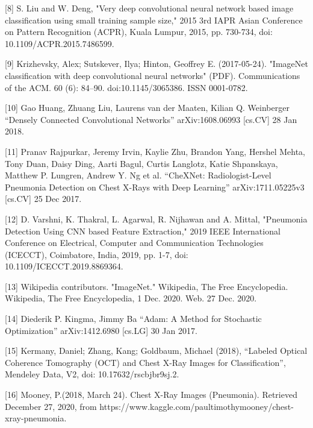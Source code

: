 \documentclass[conference]{IEEEtran}
\begin{document}
[8] S. Liu and W. Deng, "Very deep convolutional neural network based image classification using small training sample size," 2015 3rd IAPR Asian Conference on Pattern Recognition (ACPR), Kuala Lumpur, 2015, pp. 730-734, doi: 10.1109/ACPR.2015.7486599.
\newline

[9] Krizhevsky, Alex; Sutskever, Ilya; Hinton, Geoffrey E. (2017-05-24). "ImageNet classification with deep convolutional neural networks" (PDF). Communications of the ACM. 60 (6): 84–90. doi:10.1145/3065386. ISSN 0001-0782.
\newline

[10]  Gao Huang, Zhuang Liu, Laurens van der Maaten, Kilian Q. Weinberger “Densely Connected Convolutional Networks”   arXiv:1608.06993 [cs.CV]   28 Jan 2018.
\newline

[11] Pranav Rajpurkar, Jeremy Irvin, Kaylie Zhu, Brandon Yang, Hershel Mehta, Tony Duan, Daisy Ding, Aarti Bagul, Curtis Langlotz, Katie Shpanskaya, Matthew P. Lungren, Andrew Y. Ng et al. “CheXNet: Radiologist-Level Pneumonia Detection on Chest X-Rays with Deep Learning” arXiv:1711.05225v3 [cs.CV] 25 Dec 2017.
\newline

[12]  D. Varshni, K. Thakral, L. Agarwal, R. Nijhawan and A. Mittal, "Pneumonia Detection Using CNN based Feature Extraction," 2019 IEEE International Conference on Electrical, Computer and Communication Technologies (ICECCT), Coimbatore, India, 2019, pp. 1-7, doi: 10.1109/ICECCT.2019.8869364.
\newline

[13] Wikipedia contributors. "ImageNet." Wikipedia, The Free Encyclopedia. Wikipedia, The Free Encyclopedia, 1 Dec. 2020. Web. 27 Dec. 2020.
\newline

[14]  Diederik P. Kingma, Jimmy Ba “Adam: A Method for Stochastic Optimization” arXiv:1412.6980 [cs.LG] 30 Jan 2017.
\newline

[15] Kermany, Daniel; Zhang, Kang; Goldbaum, Michael (2018), “Labeled Optical Coherence Tomography (OCT) and Chest X-Ray Images for Classification”, Mendeley Data, V2, doi: 10.17632/rscbjbr9sj.2.
\newline

[16] Mooney, P.(2018, March 24). Chest X-Ray Images (Pneumonia). Retrieved December 27, 2020, from https://www.kaggle.com/paultimothymooney/chest-xray-pneumonia.
\newline
\end{document}
